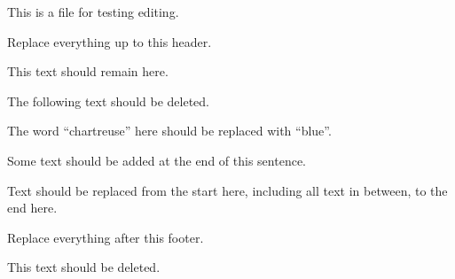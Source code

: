 This is a file for testing editing.

Replace everything up to this header.

This text should remain here.

The following text should be deleted.

The word ``chartreuse'' here should be replaced with ``blue''.

Some text should be added at the end of this sentence.

Text should be replaced from the start here, including all text in between, to
the end here.

Replace everything after this footer.

This text should be deleted.
